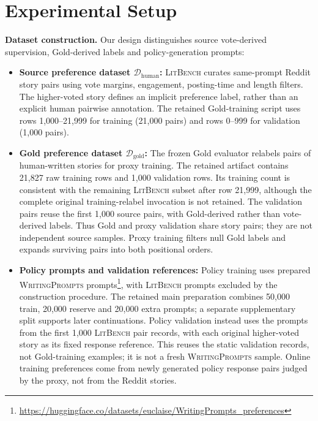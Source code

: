 \documentclass[11pt,letterpaper]{article}
\begin{document}
\section{Experimental Setup}

\textbf{Dataset construction.} Our design distinguishes source vote-derived supervision, Gold-derived labels and policy-generation prompts:
\begin{itemize}
    \item \textbf{Source preference dataset $\mathcal{D}_{\text{human}}$:} \textsc{LitBench} \citep{fein2025litbench} curates same-prompt Reddit story pairs using vote margins, engagement, posting-time and length filters. The higher-voted story defines an implicit preference label, rather than an explicit human pairwise annotation. The retained Gold-training script uses rows 1{,}000--21{,}999 for training (21{,}000 pairs) and rows 0--999 for validation (1{,}000 pairs).
    \item \textbf{Gold preference dataset $\mathcal{D}_{\text{gold}}$:} The frozen Gold evaluator relabels pairs of human-written stories for proxy training. The retained artifact contains 21{,}827 raw training rows and 1{,}000 validation rows. Its training count is consistent with the remaining \textsc{LitBench} subset after row 21{,}999, although the complete original training-relabel invocation is not retained. The validation pairs reuse the first 1{,}000 source pairs, with Gold-derived rather than vote-derived labels. Thus Gold and proxy validation share story pairs; they are not independent source samples. Proxy training filters null Gold labels and expands surviving pairs into both positional orders.
    \item \textbf{Policy prompts and validation references:} Policy training uses prepared \textsc{WritingPrompts} prompts\footnote{\url{https://huggingface.co/datasets/euclaise/WritingPrompts_preferences}}, with \textsc{LitBench} prompts excluded by the construction procedure. The retained main preparation combines 50{,}000 train, 20{,}000 reserve and 20{,}000 extra prompts; a separate supplementary split supports later continuations. Policy validation instead uses the prompts from the first 1{,}000 \textsc{LitBench} pair records, with each original higher-voted story as its fixed response reference. This reuses the static validation records, not Gold-training examples; it is not a fresh \textsc{WritingPrompts} sample. Online training preferences come from newly generated policy response pairs judged by the proxy, not from the Reddit stories.
\end{itemize}
\end{document}
